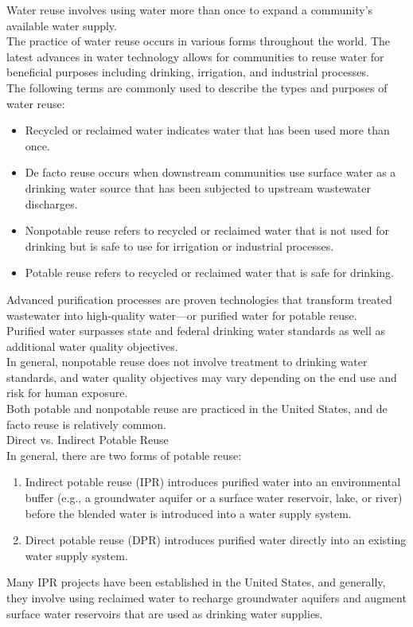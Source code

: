 \documentclass{article}
\begin{document}
Water reuse involves using water more than once to expand a community’s available water supply.\\ The practice of water reuse occurs in various forms throughout the world. The latest advances in water technology allows for communities to reuse water for beneficial purposes including drinking, irrigation, and industrial processes. \\
The following terms are commonly used to describe the types and purposes of water reuse:
\begin{itemize}
\item Recycled or reclaimed water indicates water that has been used more than once.
\item De facto reuse occurs when downstream communities use surface water as a drinking water source that has been subjected to upstream wastewater discharges.
\item Nonpotable reuse refers to recycled or reclaimed water that is not used for drinking but is safe to use for irrigation or industrial processes.
\item Potable reuse refers to recycled or reclaimed water that is safe for drinking.
\end{itemize}
Advanced purification processes are proven technologies that transform treated wastewater into high-quality water—or purified water for potable reuse. \\
Purified water surpasses state and federal drinking water standards as well as additional water quality objectives. \\
In general, nonpotable reuse does not involve treatment to drinking water standards, and water quality objectives may vary depending on the end use and risk for human exposure. \\
Both potable and nonpotable reuse are practiced in the United States, and de facto reuse is relatively common.\\

Direct vs. Indirect Potable Reuse\\

In general, there are two forms of potable reuse:
\begin{enumerate}
\item Indirect potable reuse (IPR) introduces purified water into an environmental buffer (e.g., a groundwater aquifer or a surface water reservoir, lake, or river) before the blended water is introduced into a water supply system.
\item Direct potable reuse (DPR) introduces purified water directly into an existing water supply system.
\end{enumerate}
Many IPR projects have been established in the United States, and generally, they involve using reclaimed water to recharge groundwater aquifers and augment surface water reservoirs that are used as drinking water supplies.\\
\end{document}
